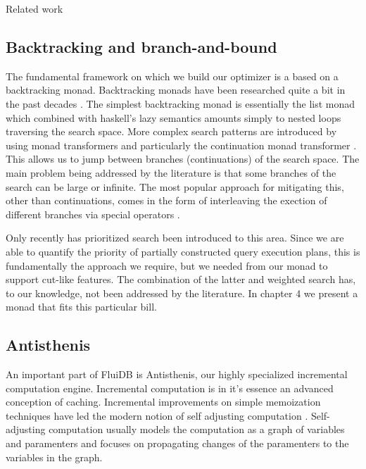 \begin{corrected}{Related work}
\subsection{Backtracking and branch-and-bound}

The fundamental framework on which we build our optimizer is a based
on a backtracking monad. Backtracking monads have been researched
quite a bit in the past decades
\cite{kiselyovBacktrackingInterleavingTerminating,hinzeEfficientMonadicstyleBacktracking,hinzeDerivingBacktrackingMonad2000a,fischerReinventingHaskellBacktracking2009}. The
simplest backtracking monad is essentially the list monad which
combined with haskell's lazy semantics amounts simply to nested loops
traversing the search space. More complex search patterns are
introduced by using monad transformers
\cite{hedgesMonadTransformersBacktracking2014} and particularly the
continuation monad transformer
\cite{hinzeMonadicStyleBacktracking1996}. This allows us to jump
between branches (continuations) of the search space. The main problem
being addressed by the literature is that some branches of the search
can be large or infinite. The most popular approach for mitigating
this, other than continuations, comes in the form of interleaving the
exection of different branches via special operators
\cite{kiselyovBacktrackingInterleavingTerminating2005}.

Only recently \cite{kidneyAlgebrasWeightedSearch2021} has prioritized
search been introduced to this area. Since we are able to quantify the
priority of partially constructed query execution plans, this is
fundamentally the approach we require, but we needed from our monad to
support cut-like features. The combination of the latter and weighted
search has, to our knowledge, not been addressed by the literature. In
chapter 4 we present a monad that fits this particular bill.

\subsection{Antisthenis}

An important part of FluiDB is Antisthenis, our highly specialized
incremental computation engine. Incremental computation is in it's
essence an advanced conception of caching. Incremental improvements on
simple memoization techniques
\cite{pughIncrementalComputationFunction1989} have led the modern
notion of self adjusting computation
\cite{acarSelfadjustingComputation2005}. Self-adjusting computation
usually models the computation as a graph of variables and paramenters
and focuses on propagating changes of the paramenters to the variables
in the graph.


\end{corrected}
